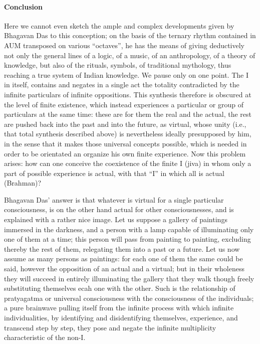 \paragraph{Conclusion}


Here we cannot even sketch the ample and complex developments given by Bhagavan Das to this conception; on the basis of the ternary rhythm contained in AUM transposed on various ``octaves'', he has the means of giving deductively not only the general lines of a logic, of a music, of an anthropology, of a theory of knowledge, but also of the rituals, symbols, of traditional mythology, thus reaching a true system of Indian knowledge. We pause only on one point. The I in itself, contains and negates in a single act the totality contradicted by the infinite particulars of infinite oppositions. This synthesis therefore is obscured at the level of finite existence, which instead experiences a particular or group of particulars at the same time: these are for them the real and the actual, the rest are pushed back into the past and into the future, as virtual, whose unity (i.e., that total synthesis described above) is nevertheless ideally presupposed by him, in the sense that it makes those universal concepts possible, which is needed in order to be orientated an organize his own finite experience. Now this problem arises: how can one conceive the coexistence of the finite I (jiva) in whom only a part of possible experience is actual, with that ``I'' in which all is actual (Brahman)?

Bhagavan Das' answer is that whatever is virtual for a single particular consciousness, is on the other hand actual for other consciousnesses, and is explained with a rather nice image. Let us suppose a gallery of paintings immersed in the darkness, and a person with a lamp capable of illuminating only one of them at a time; this person will pass from painting to painting, excluding thereby the rest of them, relegating them into a past or a future. Let us now assume as many persons as paintings: for each one of them the same could be said, however the opposition of an actual and a virtual; but in their wholeness they will succeed in entirely illuminating the gallery that they walk though freely substituting themselves ecah one with the other. Such is the relationship of pratyagatma or universal consciousness with the consciousness of the individuals; a pure brainwave pulling itself from the infinite process with which infinite individualities, by identifying and disidentifying themselves, experience, and transcend step by step, they pose and negate the infinite multiplicity characteristic of the non-I.

